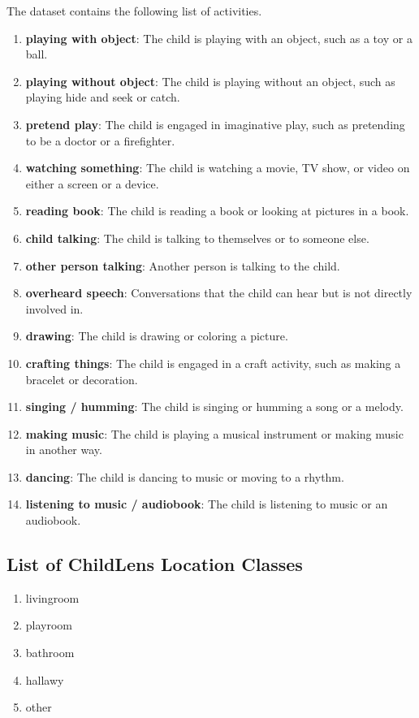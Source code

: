 \documentclass[
  man,floatsintext]{apa6}
\providecommand{\tightlist}{%
  \setlength{\itemsep}{0pt}\setlength{\parskip}{0pt}}
\begin{document}
The dataset contains the following list of activities.

\begin{enumerate}
\def\labelenumi{\arabic{enumi}.}
\tightlist
\item
  \textbf{playing with object}: The child is playing with an object, such as a toy or a ball.
\item
  \textbf{playing without object}: The child is playing without an object, such as playing hide and seek or catch.
\item
  \textbf{pretend play}: The child is engaged in imaginative play, such as pretending to be a doctor or a firefighter.
\item
  \textbf{watching something}: The child is watching a movie, TV show, or video on either a screen or a device.
\item
  \textbf{reading book}: The child is reading a book or looking at pictures in a book.
\item
  \textbf{child talking}: The child is talking to themselves or to someone else.
\item
  \textbf{other person talking}: Another person is talking to the child.
\item
  \textbf{overheard speech}: Conversations that the child can hear but is not directly involved in.
\item
  \textbf{drawing}: The child is drawing or coloring a picture.
\item
  \textbf{crafting things}: The child is engaged in a craft activity, such as making a bracelet or decoration.
\item
  \textbf{singing / humming}: The child is singing or humming a song or a melody.
\item
  \textbf{making music}: The child is playing a musical instrument or making music in another way.
\item
  \textbf{dancing}: The child is dancing to music or moving to a rhythm.
\item
  \textbf{listening to music / audiobook}: The child is listening to music or an audiobook.
\end{enumerate}

\subsection{List of ChildLens Location Classes}\label{list-of-childlens-location-classes}

\begin{enumerate}
\def\labelenumi{\arabic{enumi}.}
\tightlist
\item
  livingroom
\item
  playroom
\item
  bathroom
\item
  hallawy
\item
  other
\end{enumerate}
\end{document}
